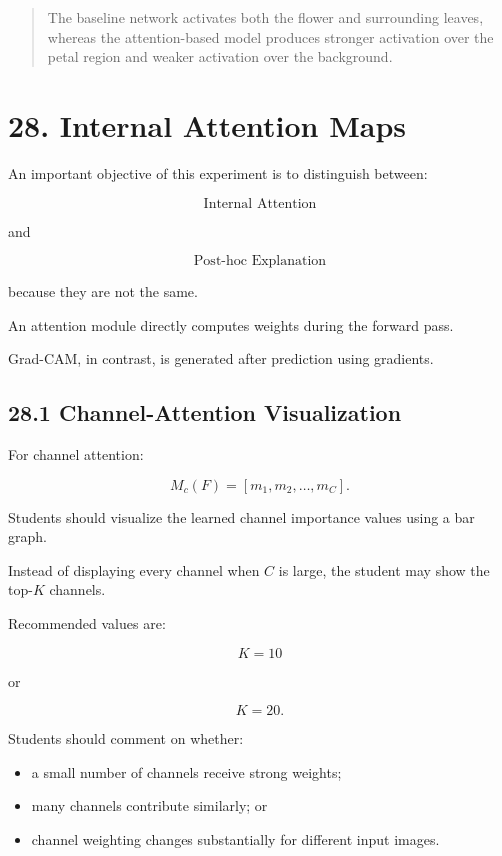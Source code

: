 \documentclass[10pt]{article}
\begin{document}
\begin{quote}
The baseline network activates both the flower and surrounding leaves,
whereas the attention-based model produces stronger activation over the petal
region and weaker activation over the background.
\end{quote}

\section*{28. Internal Attention Maps}

An important objective of this experiment is to distinguish between:

\[
\boxed{\text{Internal Attention}}
\]

and

\[
\boxed{\text{Post-hoc Explanation}}
\]

because they are not the same.

An attention module directly computes weights during the forward pass.

Grad-CAM, in contrast, is generated after prediction using gradients.

\subsection*{28.1 Channel-Attention Visualization}

For channel attention:

\[
M_c(F)
=
[m_1,m_2,\ldots,m_C].
\]

Students should visualize the learned channel importance values using a bar
graph.

Instead of displaying every channel when $C$ is large, the student may show
the top-$K$ channels.

Recommended values are:

\[
K=10
\]

or

\[
K=20.
\]

Students should comment on whether:

\begin{itemize}

\item a small number of channels receive strong weights;

\item many channels contribute similarly; or

\item channel weighting changes substantially for different input images.

\end{itemize}
\end{document}

